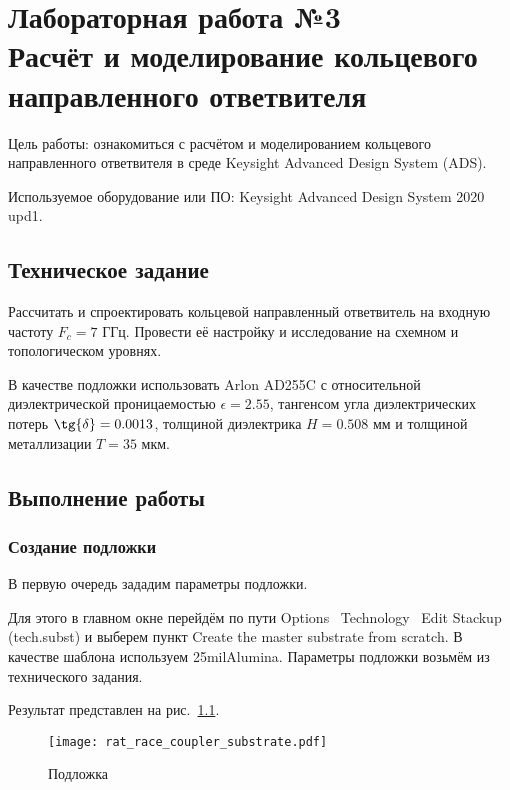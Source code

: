 \chapter{Лабораторная работа №3 \\
Расчёт и моделирование кольцевого направленного ответвителя}

Цель работы: ознакомиться с расчётом и моделированием кольцевого направленного ответвителя в среде Keysight Advanced Design System (ADS).

Используемое оборудование или ПО: Keysight Advanced Design System 2020 upd1.

\section{Техническое задание}

Рассчитать и спроектировать кольцевой направленный ответвитель на входную частоту $F_c = 7 \text{~ГГц}$.
Провести её настройку и исследование на схемном и топологическом уровнях.

В качестве подложки использовать Arlon AD255C с относительной диэлектрической проницаемостью $\epsilon = 2.55$, тангенсом угла диэлектрических потерь $\tg{\delta} = 0.0013$, толщиной диэлектрика $H = 0.508 \text{~мм}$ и толщиной металлизации $T = 35 \text{~мкм}$.

\section{Выполнение работы}

\subsection{Создание подложки}

В первую очередь зададим параметры подложки.

Для этого в главном окне перейдём по пути Options \textrightarrow\ Technology \textrightarrow\ Edit Stackup (tech.subst) и выберем пункт Create the master substrate from scratch.
В качестве шаблона используем 25milAlumina.
Параметры подложки возьмём из технического задания.

Результат представлен на рис.~\ref{fig:rat_race_coupler_substrate}.

\begin{figure}
    \centering
    \texttt{[image: rat\_race\_coupler\_substrate.pdf]}
    \caption{Подложка}%
    \label{fig:rat_race_coupler_substrate}
\end{figure}

